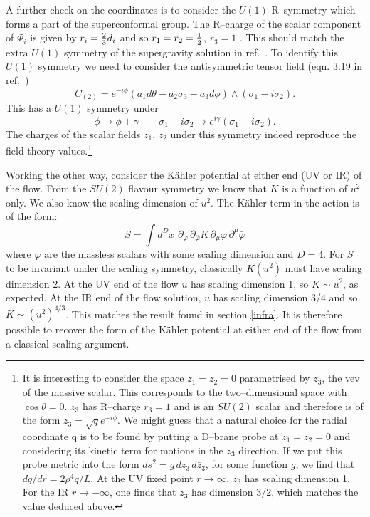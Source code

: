 \documentclass[a4paper,12pt]{article}
\newcommand{\labell}[1]{\label{#1}}
\begin{document}
A further check on the coordinates is to consider the $U(1)$
R--symmetry which forms a part of the superconformal group. The
R--charge of the scalar component of $\Phi_i$ is given by $r_i = {2
  \over 3} d_i$ and so $r_1 = r_2 = {1 \over 2}$, $r_3 = 1$ . This
should match the extra $U(1)$ symmetry of the supergravity solution in
ref.~\cite{pw2}. To identify this $U(1)$ symmetry we need to consider
the antisymmetric tensor field (eqn.  3.19 in ref.~\cite{pw2})
\begin{equation}
C_{(2)} = e^{-i \phi} (a_1 d\theta - a_2 \sigma_3 - a_3 d\phi) \wedge (\sigma_1 - i \sigma_2) .
\end{equation}
This has a $U(1)$ symmetry under 
\begin{equation}
  \phi  \rightarrow \phi + \gamma  \qquad \sigma_1 - i \sigma_2 \rightarrow e^{i \gamma} ( \sigma_1 - i \sigma_2) . 
\end{equation}
The charges of the scalar fields $z_1$, $z_2$ under this symmetry
indeed reproduce the field theory values.\footnote{It is interesting
  to consider the space $z_1 = z_2 = 0$ parametrised by $z_3$, the vev
  of the massive scalar. This corresponds to the two--dimensional
  space with $\cos\theta = 0$.  $z_3$ has R--charge $r_3 = 1$ and is
  an $SU(2)$ scalar and therefore is of the form $z_3 = \sqrt{q}
  e^{-i\phi}$. We might guess that a natural choice for the radial
  coordinate q is to be found by putting a D--brane probe at $z_1 = z_2
  = 0$ and considering its kinetic term for motions in the $z_3$
  direction.  If we put this probe metric into the form $ds^2 = g \,
  dz_3 \, d\bar{z}_3$, for some function $g$, we find that
  ${dq / dr} = {2 \rho^4 q / L}.$
%
At the UV fixed point $r \to \infty$, $z_3$ has scaling dimension 1.
For the IR $r \to -\infty$, one finds that $z_3$ has dimension 3/2,
which matches the value deduced above.}

Working the other way, consider the K\"ahler potential at either end
(UV or IR) of the flow.  From the $SU(2)$ flavour symmetry we know
that $K$ is a function of $u^2$ only.  We also know the scaling
dimension of $u^2$.  The K\"ahler term in the action is of the form:
\begin{equation}
  S = \int d^D\! x \,\, \partial_\varphi \, \partial_{\bar{\varphi}} K \, \partial_\mu \varphi \, \partial^\mu \bar{\varphi}
  \labell{Kaction}
\end{equation}
where $\varphi$ are the massless scalars with some scaling dimension
and $D=4$.  For $S$ to be invariant under the scaling symmetry,
classically $K(u^2)$ must have scaling dimension 2.  At the UV end of
the flow $u$ has scaling dimension 1, so $K \sim u^2$, as expected.
At the IR end of the flow solution, $u$ has scaling dimension 3/4 and
so $K \sim (u^2)^{4/3}$.  This matches the result found in section
\ref{infra}.  It is therefore possible to recover the form of the
K\"ahler potential at either end of the flow from a classical scaling
argument.
\end{document}
